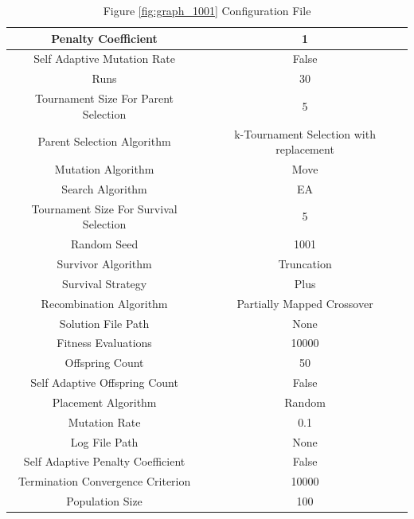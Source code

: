 \documentclass{standalone}
\begin{document}
\begin{table}[!htb]
	\centering
	\caption{Figure \ref{fig:graph_1001} Configuration File}
	\label{tab:graph_1001}
	\begin{tabular}{| c | c |}
		\hline
		Penalty Coefficient		& 1		 \\
		\hline
		Self Adaptive Mutation Rate		& False		 \\
		\hline
		Runs		& 30		 \\
		\hline
		Tournament Size For Parent Selection		& 5		 \\
		\hline
		Parent Selection Algorithm		& k-Tournament Selection with replacement		 \\
		\hline
		Mutation Algorithm		& Move		 \\
		\hline
		Search Algorithm		& EA		 \\
		\hline
		Tournament Size For Survival Selection		& 5		 \\
		\hline
		Random Seed		& 1001		 \\
		\hline
		Survivor Algorithm		& Truncation		 \\
		\hline
		Survival Strategy		& Plus		 \\
		\hline
		Recombination Algorithm		& Partially Mapped Crossover		 \\
		\hline
		Solution File Path		& None		 \\
		\hline
		Fitness Evaluations		& 10000		 \\
		\hline
		Offspring Count		& 50		 \\
		\hline
		Self Adaptive Offspring Count		& False		 \\
		\hline
		Placement Algorithm		& Random		 \\
		\hline
		Mutation Rate		& 0.1		 \\
		\hline
		Log File Path		& None		 \\
		\hline
		Self Adaptive Penalty Coefficient		& False		 \\
		\hline
		Termination Convergence Criterion		& 10000		 \\
		\hline
		Population Size		& 100		 \\
		\hline
	\end{tabular}
\end{table}
\end{document}
